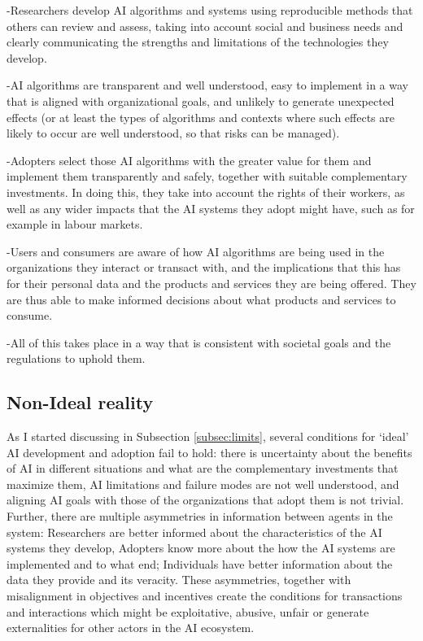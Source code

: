 \documentclass[11pt]{article}
\begin{document}
-Researchers develop AI algorithms and systems using reproducible methods that others can review and assess, taking into account social and business needs and clearly communicating the strengths and limitations of the technologies they develop. 

-AI algorithms are transparent and well understood, easy to implement in a way that is aligned with organizational goals, and unlikely to generate unexpected effects (or at least the types of algorithms and contexts where such effects are likely to occur are well understood, so that risks can be managed). 

-Adopters select those AI algorithms with the greater value for them and implement them transparently and safely, together with suitable complementary investments. In doing this, they take into account the rights of their workers, as well as any wider impacts that the AI systems they adopt might have, such as for example in labour markets. 

-Users and consumers are aware of how AI algorithms are being used in the organizations they interact or transact with, and the implications that this has for their personal data and the products and services they are being offered.  They are thus able to make informed decisions about what products and services to consume. 

-All of this takes place in a way that is consistent with societal goals and the regulations to uphold them. 

\subsection{Non-Ideal reality}
\label{subsec:non_ideal}
As I started discussing in Subsection \ref{subsec:limits}, several conditions for `ideal' AI development and adoption fail to hold: there is uncertainty about the benefits of AI in different situations and what are the complementary investments that maximize them, AI limitations and failure modes are not well understood, and aligning AI goals with those of the organizations that adopt them is not trivial. Further, there are multiple asymmetries in information between agents in the system: Researchers are better informed about the characteristics of the AI systems they develop, Adopters know more about the how the AI systems are implemented and to what end; Individuals have better information about the data they provide and its veracity. These asymmetries, together with misalignment in objectives and incentives create the conditions for transactions and interactions which might be exploitative, abusive, unfair or generate externalities for other actors in the AI ecosystem. 
\end{document}
